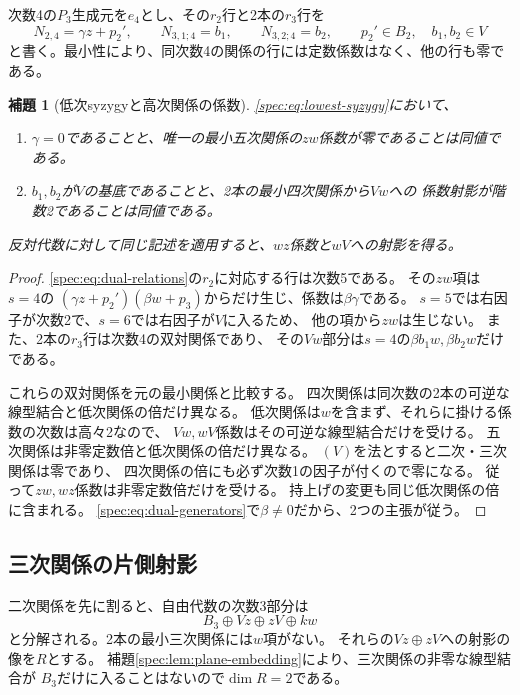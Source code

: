 \documentclass[11pt,a4paper]{ltjsarticle}
\newtheorem{lemma}[theorem]{補題}
\theoremstyle{definition}
\begin{document}
次数4の$P_3$生成元を$e_4$とし、その$r_2$行と2本の$r_3$行を
\begin{equation}\label{spec:eq:lowest-syzygy}
N_{2,4}=\gamma z+p_2',\qquad
N_{3,1;4}=b_1,\qquad N_{3,2;4}=b_2,\qquad
p_2'\in B_2,\quad b_1,b_2\in V
\end{equation}
と書く。最小性により、同次数4の関係の行には定数係数はなく、他の行も零である。

\begin{lemma}[低次syzygyと高次関係の係数]\label{spec:lem:dual-coefficients}
\eqref{spec:eq:lowest-syzygy}において、
\begin{enumerate}
\item $\gamma=0$であることと、唯一の最小五次関係の$zw$係数が零であることは同値である。
\item $b_1,b_2$が$V$の基底であることと、2本の最小四次関係から$Vw$への
係数射影が階数2であることは同値である。
\end{enumerate}
反対代数に対して同じ記述を適用すると、$wz$係数と$wV$への射影を得る。
\end{lemma}
\begin{proof}
\eqref{spec:eq:dual-relations}の$r_2$に対応する行は次数5である。
その$zw$項は$s=4$の
$(\gamma z+p_2')(\beta w+p_3)$からだけ生じ、係数は$\beta\gamma$である。
$s=5$では右因子が次数2で、$s=6$では右因子が$V$に入るため、
他の項から$zw$は生じない。
また、2本の$r_3$行は次数4の双対関係であり、
その$Vw$部分は$s=4$の$\beta b_1w,\beta b_2w$だけである。

これらの双対関係を元の最小関係と比較する。
四次関係は同次数の2本の可逆な線型結合と低次関係の倍だけ異なる。
低次関係は$w$を含まず、それらに掛ける係数の次数は高々2なので、
$Vw,wV$係数はその可逆な線型結合だけを受ける。
五次関係は非零定数倍と低次関係の倍だけ異なる。
$(V)$を法とすると二次・三次関係は零であり、
四次関係の倍にも必ず次数1の因子が付くので零になる。
従って$zw,wz$係数は非零定数倍だけを受ける。
持上げの変更も同じ低次関係の倍に含まれる。
\eqref{spec:eq:dual-generators}で$\beta\ne0$だから、2つの主張が従う。
\end{proof}

\subsection{三次関係の片側射影}
二次関係を先に割ると、自由代数の次数3部分は
\[
B_3\oplus Vz\oplus zV\oplus kw
\]
と分解される。2本の最小三次関係には$w$項がない。
それらの$Vz\oplus zV$への射影の像を$R$とする。
補題\ref{spec:lem:plane-embedding}により、三次関係の非零な線型結合が
$B_3$だけに入ることはないので$\dim R=2$である。
\end{document}
